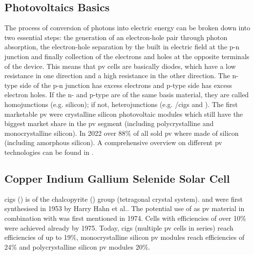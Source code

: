 \subsection{Photovoltaics Basics}
The process of conversion of photons into electric energy can be broken down into two essential steps: 
the generation of an electron-hole pair through photon absorption, the electron-hole separation by the built in electric field at the p-n junction and finally collection of the electrons and holes at the opposite terminals of the device\cite{markvart2013principles}.
This means that \gls{pv} cells are basically diodes, which have a low resistance in one direction and a high resistance in the other direction. 
The n-type side of the p-n junction has excess electrons and p-type side has excess electron holes. 
If the n- and p-type are of the same basis material, they are called homojunctions (e.g. silicon); if not, heterojunctions (e.g. /\gls{cigs} and )\cite{breitenstein2013understanding}.
%
The first marketable \gls{pv} were crystalline silicon photovoltaic modules which still 
have the biggest market share in the \gls{pv} segment (including polycrystalline and monocrystalline silicon).
In 2022 over 88\% of all sold \gls{pv} where made of silicon (including amorphous silicon)\cite{breitenstein2013understanding}.
%
A comprehensive overview on different \gls{pv} technologies can be found in \cite{markvart2013principles}.


\subsection{Copper Indium Gallium Selenide Solar Cell}
\gls{cigs} () is of the chalcopyrite () group (tetragonal crystal system). 
 and  were first synthesised in 1953 by Harry Hahn et al.\cite{hahn1953untersuchungen}.
The potential use of  as \gls{pv} material in combination with  was first mentioned in 1974\cite{wagner1974cuinse2}.
Cells with efficiencies of over 10\% were achieved already by 1975\cite{kazmerski1976thin}.
Today, 
\gls{cigs} (multiple \gls{pv} cells in series) 
reach efficiencies of up to 19\%,
monocrystalline silicon \gls{pv} modules reach efficiencies of 24\%
and polycrystalline silicon \gls{pv} modules 20\%\cite{green2023solar}.

